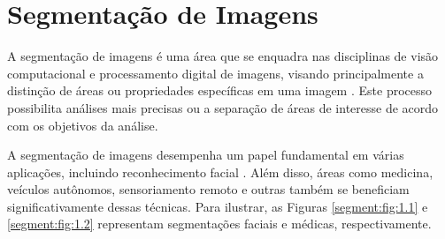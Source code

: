 \newpage
\clearpage
\section{Segmentação de Imagens}
\label{segment}

A segmentação de imagens é uma área que se enquadra nas disciplinas de visão computacional e processamento digital de imagens, visando principalmente a distinção de áreas ou propriedades específicas em uma imagem \citep{Haralick1985, Yuheng2017, Ghosh2019}. Este processo possibilita análises mais precisas ou a separação de áreas de interesse de acordo com os objetivos da análise.

A segmentação de imagens desempenha um papel fundamental em várias aplicações, incluindo reconhecimento facial \citep{Yuheng2017}. Além disso, áreas como medicina, veículos autônomos, sensoriamento remoto e outras também se beneficiam significativamente dessas técnicas. Para ilustrar, as Figuras \ref{segment:fig:1.1} e \ref{segment:fig:1.2} representam segmentações faciais e médicas, respectivamente.

